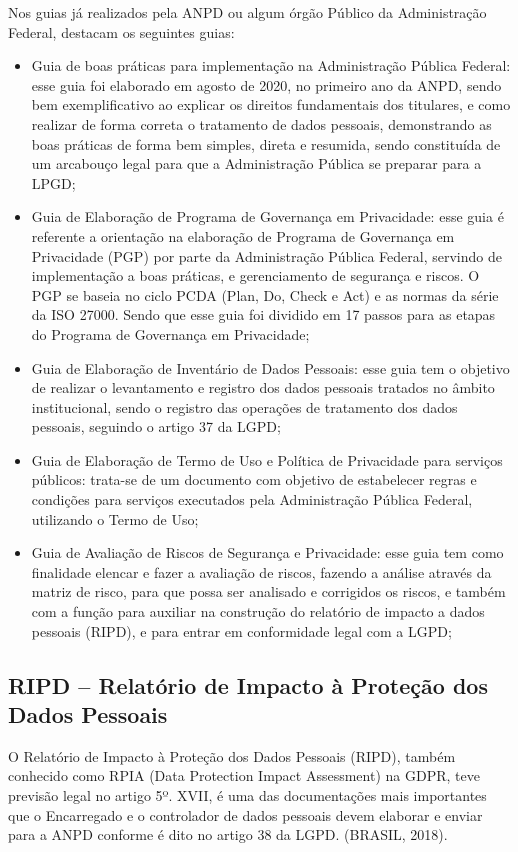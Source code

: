 \documentclass[
	12pt,				%
	openright,			%
	oneside,			%
	a4paper,			%
	english,			%
	french,				%
	spanish,			%
	brazil,				%
	]{abntex2}
\begin{document}
Nos guias já realizados pela ANPD ou algum órgão Público da Administração Federal, destacam os seguintes guias:
\begin{itemize}
\item Guia de boas práticas para implementação na Administração Pública Federal: esse guia foi elaborado em agosto de 2020, no primeiro ano da ANPD, sendo bem exemplificativo ao explicar os direitos fundamentais dos titulares, e como realizar de forma correta o tratamento de dados pessoais, demonstrando as boas práticas de forma bem simples, direta e resumida, sendo constituída de um arcabouço legal para que a Administração Pública se preparar para a LPGD; 
\item Guia de Elaboração de Programa de Governança em Privacidade: esse guia é referente a orientação na elaboração de Programa de Governança em Privacidade (PGP) por parte da Administração Pública Federal, servindo de implementação a boas práticas, e gerenciamento de segurança e riscos. O PGP se baseia no ciclo PCDA (Plan, Do, Check e Act) e as normas da série da ISO 27000. Sendo que esse guia foi dividido em 17 passos para as etapas do Programa de Governança em Privacidade;
\item Guia de Elaboração de Inventário de Dados Pessoais: esse guia tem o objetivo de realizar o levantamento e registro dos dados pessoais tratados no âmbito institucional, sendo o registro das operações de tratamento dos dados pessoais, seguindo o artigo 37 da LGPD;
\item Guia de Elaboração de Termo de Uso e Política de Privacidade para serviços públicos: trata-se de um documento com objetivo de estabelecer regras e condições para serviços executados pela Administração Pública Federal, utilizando o Termo de Uso;
\item Guia de Avaliação de Riscos de Segurança e Privacidade: esse guia tem como finalidade elencar e fazer a avaliação de riscos, fazendo a análise através da matriz de risco, para que possa ser analisado e corrigidos os riscos, e também com a função para auxiliar na construção do relatório de impacto a dados pessoais (RIPD), e para entrar em conformidade legal com a LGPD;
\end{itemize}

\subsection{ RIPD – Relatório de Impacto à Proteção dos Dados Pessoais  }

O Relatório de Impacto à Proteção dos Dados Pessoais (RIPD), também conhecido como RPIA (Data Protection Impact Assessment) na GDPR, teve previsão legal no artigo 5º. XVII, é uma das documentações mais importantes que o Encarregado e o controlador de dados pessoais devem elaborar e enviar para a ANPD conforme é dito no artigo 38 da LGPD. (BRASIL, 2018).
\end{document}
